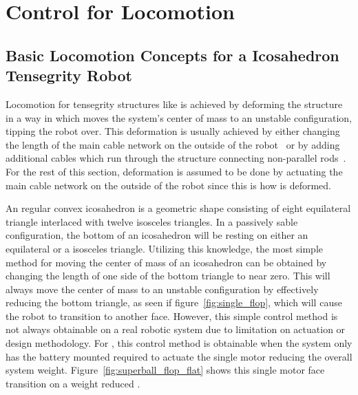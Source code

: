 \chapter{Control for \SB{} Locomotion}
\label{controls}

\section{Basic Locomotion Concepts for a Icosahedron Tensegrity Robot}
\label{basic_locomotion}

Locomotion for tensegrity structures like \SB{} is achieved by deforming the structure in a way in which moves the system's center of mass to an unstable configuration, tipping the robot over.
This deformation is usually achieved by either changing the length of the main cable network on the outside of the robot~\cite{sabelhaus2015system,kim2014rapid} or by adding additional cables which run through the structure connecting non-parallel rods~\cite{caluwaerts2014design}.
For the rest of this section, deformation is assumed to be done by actuating the main cable network on the outside of the robot since this is how \SB{} is deformed.

An regular convex icosahedron is a geometric shape consisting of eight equilateral triangle interlaced with twelve isosceles triangles.
In a passively sable configuration, the bottom of an icosahedron will be resting on either an equilateral or a isosceles triangle.
Utilizing this knowledge, the most simple method for moving the center of mass of an icosahedron can be obtained by changing the length of one side of the bottom triangle to near zero.
This will always move the center of mass to an unstable configuration by effectively reducing the bottom triangle, as seen if figure~\ref{fig:single_flop}, which will cause the robot to transition to another face.
However, this simple control method is not always obtainable on a real robotic system due to limitation on actuation or design methodology.
For \SB{}, this control method is obtainable when the system only has the battery mounted required to actuate the single motor reducing the overall system weight.
Figure~\ref{fig:superball_flop_flat} shows this single motor face transition on a weight reduced \SB{}.

